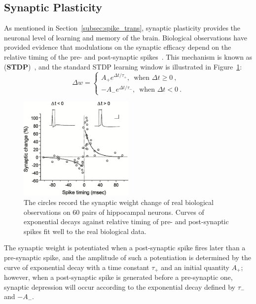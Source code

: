 \subsection{Synaptic Plasticity}
\label{subsec:STDP}
As mentioned in Section~\ref{subsec:spike_trans}, synaptic plasticity provides the neuronal level of learning and \protect{} memory of the brain.
Biological observations have provided evidence that modulations on the synaptic efficacy depend on the relative timing of the pre- and post-synaptic spikes~\citep{bi1998synaptic}.
This mechanism is known as \protect{} \protect{} (\textbf{STDP})~\citep{song2000competitive}, and the standard STDP learning window is illustrated in Figure~\ref{Fig:STDP}:
\begin{equation}
\Delta w = \left\{
\begin{aligned}
A_+ e^{\Delta t/\tau_+} \textrm{,~~when~} \Delta t \geq 0~, \\
-A_- e^{\Delta t/\tau_-} \textrm{,~~when~} \Delta t < 0~.
\end{aligned}
\right.
\label{equ:stdp}
\end{equation}

\begin{figure}[bt!]
	\centering
	\includegraphics[width=0.5\textwidth]{pics_snn/stdp.jpeg}
	
	\caption{\protect{}\citep{bi2001synaptic}\protect{}
	The circles record the synaptic weight change of real biological observations on 60 pairs of hippocampal neurons.
	Curves of exponential decays against relative timing of pre- and post-synaptic spikes fit well to the real biological data.
	}
	\label{Fig:STDP}
\end{figure}

The synaptic weight is potentiated when a post-synaptic spike fires later than a pre-synaptic spike, and the amplitude of such a potentiation is determined by the curve of exponential decay with a time constant $\tau_+$ and an initial quantity $A_+$;
however, when a post-synaptic spike is generated before a pre-synaptic one, synaptic depression will occur according to the exponential decay defined by $\tau_-$ and $-A_-$.

